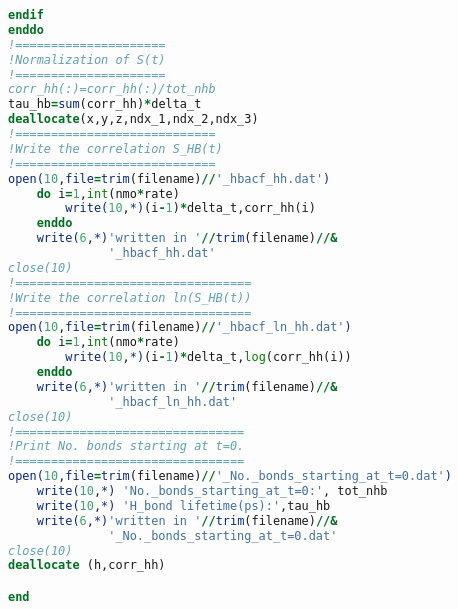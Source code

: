 \begin{lstlisting}[language=fortran]
    endif
enddo
!=====================
!Normalization of S(t)
!=====================
corr_hh(:)=corr_hh(:)/tot_nhb
tau_hb=sum(corr_hh)*delta_t
deallocate(x,y,z,ndx_1,ndx_2,ndx_3)
!============================
!Write the correlation S_HB(t)
!============================
open(10,file=trim(filename)//'_hbacf_hh.dat')
    do i=1,int(nmo*rate)
        write(10,*)(i-1)*delta_t,corr_hh(i)
    enddo
    write(6,*)'written in '//trim(filename)//&
              '_hbacf_hh.dat'
close(10)
!=================================
!Write the correlation ln(S_HB(t))
!=================================
open(10,file=trim(filename)//'_hbacf_ln_hh.dat')
    do i=1,int(nmo*rate)
        write(10,*)(i-1)*delta_t,log(corr_hh(i))
    enddo
    write(6,*)'written in '//trim(filename)//&
              '_hbacf_ln_hh.dat'
close(10)
!================================
!Print No. bonds starting at t=0.
!================================
open(10,file=trim(filename)//'_No._bonds_starting_at_t=0.dat')
    write(10,*) 'No._bonds_starting_at_t=0:', tot_nhb
    write(10,*) 'H_bond lifetime(ps):',tau_hb
    write(6,*)'written in '//trim(filename)//&
              '_No._bonds_starting_at_t=0.dat'
close(10)
deallocate (h,corr_hh)

end
\end{lstlisting}
%
